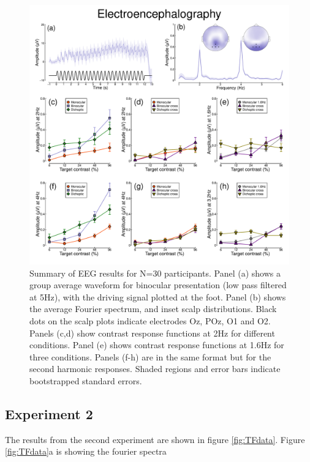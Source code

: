 \documentclass[
]{article}
\begin{document}
\begin{figure}

{\centering \includegraphics{Figures/EEGdata} 

}

\caption{Summary of EEG results for N=30 participants. Panel (a) shows a group average waveform for binocular presentation (low pass filtered at 5Hz), with the driving signal plotted at the foot. Panel (b) shows the average Fourier spectrum, and inset scalp distributions. Black dots on the scalp plots indicate electrodes Oz, POz, O1 and O2. Panels (c,d) show contrast response functions at 2Hz for different conditions. Panel (e) shows contrast response functions at 1.6Hz for three conditions. Panels (f-h) are in the same format but for the second harmonic responses. Shaded regions and error bars indicate bootstrapped standard errors.}\label{fig:EEGdata}
\end{figure}

\hypertarget{experiment-2-1}{%
\subsection{Experiment 2}\label{experiment-2-1}}

The results from the second experiment are shown in figure \ref{fig:TFdata}. Figure \ref{fig:TFdata}a is showing the fourier spectra
\end{document}
